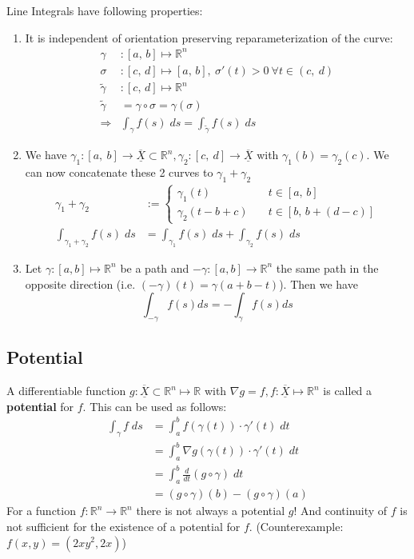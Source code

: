 \documentclass[a4paper,fontsize = 10pt]{article}
\def\R{\mathbb{R}}
\def\X{\underline{\overline{X}}}
\begin{document}
Line Integrals have following properties:
\begin{enumerate}
  \item It is independent of orientation preserving reparameterization of the curve:
  \begin{align*}
    \gamma&: [a,\, b] \mapsto \R^n\\
    \sigma&: [c, \, d] \mapsto [a, \, b], \ \sigma'(t) > 0 \ \forall t \in (c, \ d)\\
    \tilde{\gamma}&: [c,\, d] \mapsto \R^n\\
    \tilde{\gamma} &= \gamma \circ \sigma = \gamma(\sigma)\\
    \Rightarrow &\int_\gamma f(s) \; ds = \int_{\tilde{\gamma}} f(s) \; ds
  \end{align*}
  \item We have $\gamma_1: [a, \ b] \to \X \subset \R^n, \gamma_2: [c, \ d] \to \X$ with $\gamma_1(b) = \gamma_2(c)$. We can now concatenate these 2 curves to \(\gamma_1 + \gamma_2\) 
  \begin{align*}
    \gamma_1 + \gamma_2 &:=
    \begin{cases}
      \gamma_1(t) \quad& t \in [a, \, b]\\
      \gamma_2(t - b + c) \quad& t \in [b, \, b+ (d - c)]
    \end{cases}\\
    \int_{\gamma_1 + \gamma_2} f(s) \; ds &= \int_{\gamma_1} f(s) \; ds + \int_{\gamma_2} f(s)\; ds
  \end{align*}
  \item Let \(\gamma : \left[a,b\right] \mapsto \R^n\) be a path and \(-\gamma: [a, b] \to \R^n\) the same path in the opposite direction (i.e. \((-\gamma)(t) = \gamma(a + b - t)\)). Then we have
  \[\int_{-\gamma} f(s)ds = -\int_\gamma f(s) ds\]
\end{enumerate}

\subsection{Potential}
A differentiable function \(g: \X \subset \R^n \mapsto \R\) with \(\nabla g = f, f: \X \mapsto \R^n\) is called a \textbf{potential} for \(f\). This can be used as follows:
\begin{align*}
  \int_\gamma f \; ds &= \int_a^b f(\gamma(t)) \cdot \gamma'(t) \; dt\\
  &= \int_a^b \nabla g(\gamma(t)) \cdot \gamma'(t) \; dt\\
  &= \int_a^b \frac{d}{dt} (g \circ \gamma) \; dt\\
  &= (g \circ \gamma)(b) - (g \circ \gamma)(a)
\end{align*}
For a function $f: \R^n \to \R^n$ there is not always a potential $g$! And continuity of $f$ is not sufficient for the existence of a potential for $f$. (Counterexample: $f(x,y) = (2xy^2,2x)$)
\end{document}
